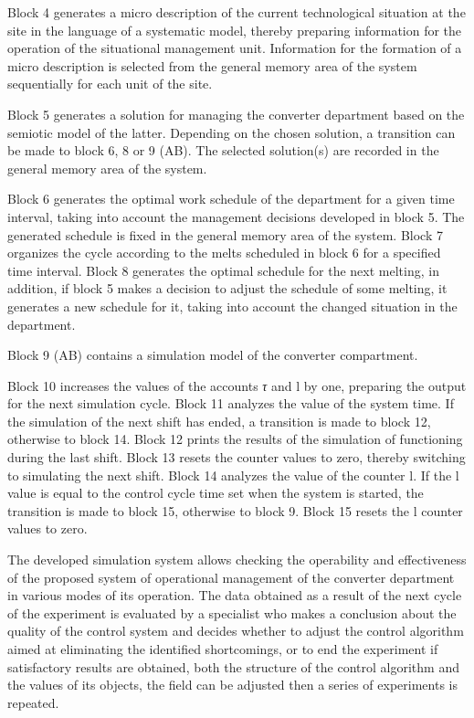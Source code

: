 Block 4 generates a micro description of the current technological
situation at the site in the language of a systematic model, thereby
preparing information for the operation of the situational management
unit. Information for the formation of a micro description is selected
from the general memory area of the system sequentially for each unit of
the site.

Block 5 generates a solution for managing the converter department based
on the semiotic model of the latter. Depending on the chosen solution, a
transition can be made to block 6, 8 or 9 (AB). The selected solution(s)
are recorded in the general memory area of the system.

Block 6 generates the optimal work schedule of the department for a
given time interval, taking into account the management decisions
developed in block 5. The generated schedule is fixed in the general
memory area of the system. Block 7 organizes the cycle according to the
melts scheduled in block 6 for a specified time interval. Block 8
generates the optimal schedule for the next melting, in addition, if
block 5 makes a decision to adjust the schedule of some melting, it
generates a new schedule for it, taking into account the changed
situation in the department.

Block 9 (AB) contains a simulation model of the converter compartment.

Block 10 increases the values of the accounts \emph{τ} and l by one,
preparing the output for the next simulation cycle. Block 11 analyzes
the value of the system time. If the simulation of the next shift has
ended, a transition is made to block 12, otherwise to block 14. Block 12
prints the results of the simulation of functioning during the last
shift. Block 13 resets the counter values to zero, thereby switching to
simulating the next shift. Block 14 analyzes the value of the counter l.
If the l value is equal to the control cycle time set when the system is
started, the transition is made to block 15, otherwise to block 9. Block
15 resets the l counter values to zero.

The developed simulation system allows checking the operability and
effectiveness of the proposed system of operational management of the
converter department in various modes of its operation. The data
obtained as a result of the next cycle of the experiment is evaluated by
a specialist who makes a conclusion about the quality of the control
system and decides whether to adjust the control algorithm aimed at
eliminating the identified shortcomings, or to end the experiment if
satisfactory results are obtained, both the structure of the control
algorithm and the values of its objects, the field can be adjusted then
a series of experiments is repeated.

